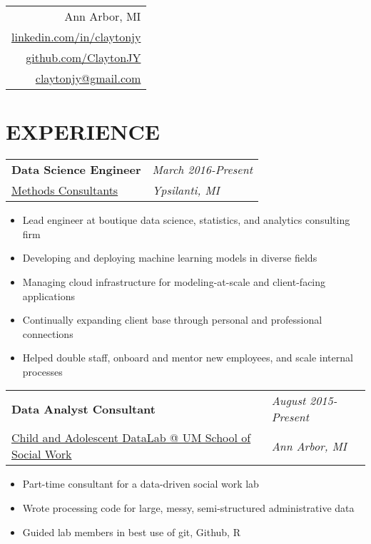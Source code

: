 \documentclass[margin,line]{res}
\begin{document}


\begin{resume}

\vspace{-.15in}
\hfill
\begin{tabular}{r}
  Ann Arbor, MI\\
  \href{http://www.linkedin.com/in/claytonjy}{linkedin.com/in/claytonjy}\\
  \href{https://github.com/ClaytonJY}{github.com/ClaytonJY} \\
  \href{mailto:claytonjy@gmail.com}{claytonjy@gmail.com} \\
\end{tabular}


\section{EXPERIENCE}

\begin{tabular}{p{4.4in} l}
  {\bf Data Science Engineer} & \emph{March 2016-Present}\\
  \href{http://www.methodsconsultants.com/}{Methods Consultants} & \emph{Ypsilanti, MI}
\end{tabular}
\vspace{2pt}
\begin{itemize}\itemsep -2pt
  \item Lead engineer at boutique data science, statistics, and analytics consulting firm
  \item Developing and deploying machine learning models in diverse fields
  \item Managing cloud infrastructure for modeling-at-scale and client-facing applications
  \item Continually expanding client base through personal and professional connections
  \item Helped double staff, onboard and mentor new employees, and scale internal processes
\end{itemize}

\begin{tabular}{p{4.4in} l}
  {\bf Data Analyst Consultant} & \emph{August 2015-Present}\\
  \href{http://www.ssw-datalab.org/}{Child and Adolescent DataLab @ UM School of Social Work} & \emph{Ann Arbor, MI}
\end{tabular}
\vspace{2pt}
\begin{itemize}\itemsep -2pt
  \item Part-time consultant for a data-driven social work lab
  \item Wrote processing code for large, messy, semi-structured administrative data
  \item Guided lab members in best use of git, Github, R
\end{itemize}


\end{resume}
\end{document}
